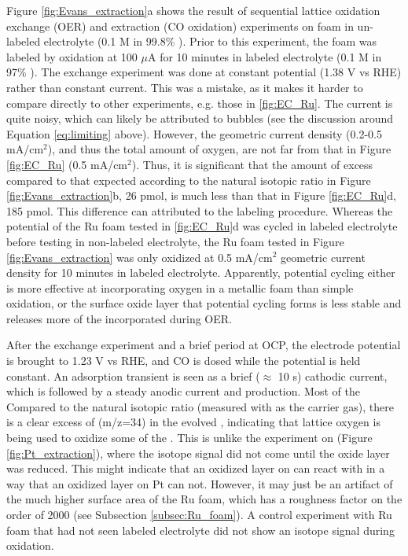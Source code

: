 Figure \ref{fig:Evans_extraction}a shows the result of sequential lattice oxidation exchange (OER) and extraction (CO oxidation) experiments on  foam in un-labeled electrolyte (0.1 M  in 99.8\% ). Prior to this experiment, the foam was labeled by oxidation at 100 $\mu$A for 10 minutes in labeled electrolyte (0.1 M  in 97\% ). The exchange experiment was done at constant potential (1.38 V vs RHE) rather than constant current. This was a mistake, as it makes it harder to compare directly to other experiments, e.g. those in \ref{fig:EC_Ru}. The current is quite noisy, which can likely be attributed to bubbles (see the discussion around Equation \ref{eq:limiting} above). However, the geometric current density (0.2-0.5 mA/cm$^2$), and thus the total amount of oxygen, are not far from that in Figure \ref{fig:EC_Ru} (0.5 mA/cm$^2$). Thus, it is significant that the amount of excess  compared to that expected according to the natural isotopic ratio in Figure \ref{fig:Evans_extraction}b, 26 pmol, is much less than that in Figure \ref{fig:EC_Ru}d, 185 pmol. This difference can attributed to the labeling procedure. Whereas the potential of the Ru foam tested in \ref{fig:EC_Ru}d was cycled in labeled electrolyte before testing in non-labeled electrolyte, the Ru foam tested in Figure \ref{fig:Evans_extraction} was only oxidized at 0.5 mA/cm$^2$ geometric current density for 10 minutes in labeled electrolyte. Apparently, potential cycling either is more effective at incorporating oxygen in a metallic foam than simple oxidation, or the surface oxide layer that potential cycling forms is less stable and releases more of the incorporated  during OER.

After the exchange experiment and a brief period at OCP, the electrode potential is brought to 1.23 V vs RHE, and CO is dosed while the potential is held constant. An adsorption transient is seen as a brief ($\approx$ 10 s) cathodic current, which is followed by a steady anodic current and  production. Most of the Compared to the natural isotopic ratio (measured with  as the carrier gas), there is a clear excess of  (m/z=34) in the evolved , indicating that lattice oxygen is being used to oxidize some of the . This is unlike the experiment on  (Figure \ref{fig:Pt_extraction}), where the isotope signal did not come until the oxide layer was reduced. This might indicate that an oxidized layer on  can react with  in a way that an oxidized layer on Pt can not. However, it may just be an artifact of the much higher surface area of the Ru foam, which has a roughness factor on the order of 2000 (see Subsection \ref{subsec:Ru_foam}). A control experiment with Ru foam that had not seen labeled electrolyte did not show an isotope signal during  oxidation.

